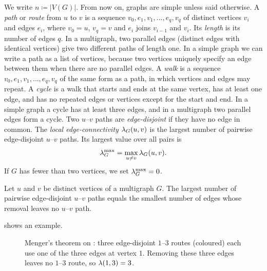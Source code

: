 We write $n\coloneq|V(G)|$.
From now on, graphs are simple unless said otherwise.
A \emph{path} or \emph{route} from $u$ to $v$ is a sequence $v_0,e_1,v_1,\ldots,e_q,v_q$ of distinct vertices $v_i$ and edges $e_i$, where $v_0=u$, $v_q=v$ and $e_i$ joins $v_{i-1}$ and $v_i$. Its \emph{length} is its number of edges $q$.
In a multigraph, two parallel edges (distinct edges with identical vertices) give two different paths of length one.
In a simple graph we can write a path as a list of vertices, because two vertices uniquely specify an edge between them when there are no parallel edges.
A \emph{walk} is a sequence $v_0,e_1,v_1,\ldots,e_q,v_q$ of the same form as a path, in which vertices and edges may repeat.
A \emph{cycle} is a walk that starts and ends at the same vertex, has at least one edge, and has no repeated edges or vertices except for the start and end.
In a simple graph a cycle has at least three edges, and in a multigraph two parallel edges form a cycle.
Two $u$--$v$ paths are \emph{edge-disjoint} if they have no edge in common.
The \emph{local edge-connectivity} $\lambda_G(u,v)$ is the largest number of pairwise edge-disjoint $u$--$v$ paths.
Its largest value over all pairs is
\[
    \lambda_G^{\max} = \max_{u \ne v} \lambda_G(u, v).
\]
If $G$ has fewer than two vertices, we set $\lambda_G^{\max}=0$.
\begin{theorem}\label{thm:menger-main}\label{thm:menger}
Let $u$ and $v$ be distinct vertices of a multigraph $G$. The largest number of pairwise edge-disjoint $u$--$v$ paths equals the smallest number of edges whose removal leaves no $u$--$v$ path.
\end{theorem}
 shows an example.

\begin{figure}[ht]
\centering
{}
\caption{Menger's theorem on : three edge-disjoint $1$--$3$ routes (coloured) each use one of the three edges at vertex $1$. Removing these three edges leaves no $1$--$3$ route, so $\lambda(1,3)=3$.}
\label{fig:menger}
\end{figure}

